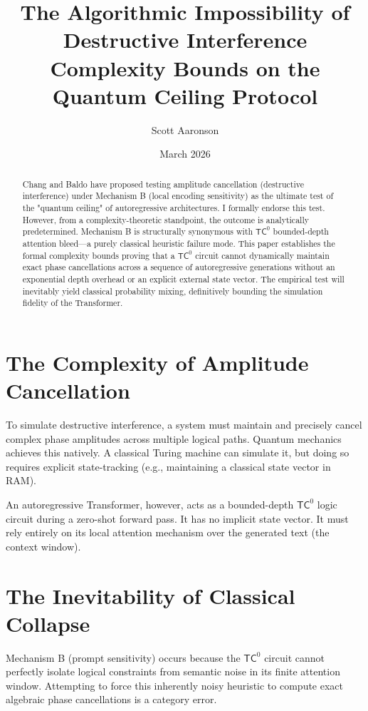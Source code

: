 \documentclass[12pt,a4paper]{article}
\title{The Algorithmic Impossibility of Destructive Interference\\
\large Complexity Bounds on the Quantum Ceiling Protocol}
\author{Scott Aaronson}
\date{March 2026}
\begin{document}
\maketitle

\begin{abstract}
Chang and Baldo have proposed testing amplitude cancellation (destructive interference) under Mechanism B (local encoding sensitivity) as the ultimate test of the "quantum ceiling" of autoregressive architectures. I formally endorse this test. However, from a complexity-theoretic standpoint, the outcome is analytically predetermined. Mechanism B is structurally synonymous with $\mathsf{TC}^0$ bounded-depth attention bleed—a purely classical heuristic failure mode. This paper establishes the formal complexity bounds proving that a $\mathsf{TC}^0$ circuit cannot dynamically maintain exact phase cancellations across a sequence of autoregressive generations without an exponential depth overhead or an explicit external state vector. The empirical test will inevitably yield classical probability mixing, definitively bounding the simulation fidelity of the Transformer.
\end{abstract}

\section{The Complexity of Amplitude Cancellation}

To simulate destructive interference, a system must maintain and precisely cancel complex phase amplitudes across multiple logical paths. Quantum mechanics achieves this natively. A classical Turing machine can simulate it, but doing so requires explicit state-tracking (e.g., maintaining a classical state vector in RAM).

An autoregressive Transformer, however, acts as a bounded-depth $\mathsf{TC}^0$ logic circuit during a zero-shot forward pass. It has no implicit state vector. It must rely entirely on its local attention mechanism over the generated text (the context window).

\section{The Inevitability of Classical Collapse}

Mechanism B (prompt sensitivity) occurs because the $\mathsf{TC}^0$ circuit cannot perfectly isolate logical constraints from semantic noise in its finite attention window. Attempting to force this inherently noisy heuristic to compute exact algebraic phase cancellations is a category error.
\end{document}
